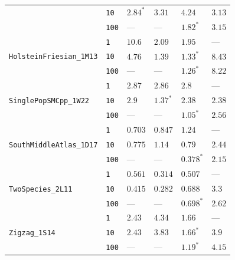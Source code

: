 \begin{footnotesize}
\begin{tabular}{llllll}
 & \texttt{10} & $\mathbf{2.84}^*$ & $3.31$ & $4.24$ & $3.13$ \\
 & \texttt{100} & --- & --- & $\mathbf{1.82}^*$ & $3.15$ \\
\cline{1-6}
\multirow[c]{3}{*}{\texttt{HolsteinFriesian\_1M13}} & \texttt{1} & $10.6$ & $2.09$ & $\mathbf{1.95}$ & --- \\
 & \texttt{10} & $4.76$ & $1.39$ & $\mathbf{1.33}^*$ & $8.43$ \\
 & \texttt{100} & --- & --- & $\mathbf{1.26}^*$ & $8.22$ \\
\cline{1-6}
\multirow[c]{3}{*}{\texttt{SinglePopSMCpp\_1W22}} & \texttt{1} & $2.87$ & $2.86$ & $\mathbf{2.8}$ & --- \\
 & \texttt{10} & $2.9$ & $\mathbf{1.37}^*$ & $2.38$ & $2.38$ \\
 & \texttt{100} & --- & --- & $\mathbf{1.05}^*$ & $2.56$ \\
\cline{1-6}
\multirow[c]{3}{*}{\texttt{SouthMiddleAtlas\_1D17}} & \texttt{1} & $\mathbf{0.703}$ & $0.847$ & $1.24$ & --- \\
 & \texttt{10} & $\mathbf{0.775}$ & $1.14$ & $0.79$ & $2.44$ \\
 & \texttt{100} & --- & --- & $\mathbf{0.378}^*$ & $2.15$ \\
\cline{1-6}
\multirow[c]{3}{*}{\texttt{TwoSpecies\_2L11}} & \texttt{1} & $0.561$ & $\mathbf{0.314}$ & $0.507$ & --- \\
 & \texttt{10} & $0.415$ & $\mathbf{0.282}$ & $0.688$ & $3.3$ \\
 & \texttt{100} & --- & --- & $\mathbf{0.698}^*$ & $2.62$ \\
\cline{1-6}
\multirow[c]{3}{*}{\texttt{Zigzag\_1S14}} & \texttt{1} & $2.43$ & $4.34$ & $\mathbf{1.66}$ & --- \\
 & \texttt{10} & $2.43$ & $3.83$ & $\mathbf{1.66}^*$ & $3.9$ \\
 & \texttt{100} & --- & --- & $\mathbf{1.19}^*$ & $4.15$ \\
\cline{1-6}
\bottomrule
\end{tabular}
\end{footnotesize}
